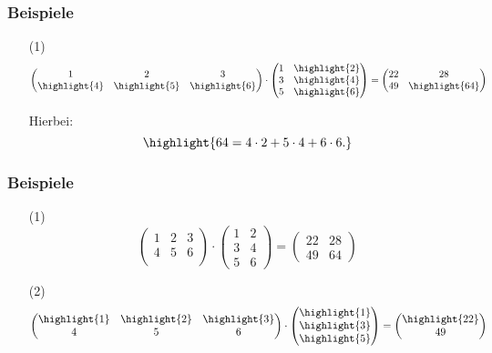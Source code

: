 %
%
\begin{frame}\frametitle{Beispiele}

	\begin{itemize}
		\item[(1)]
			$$
				\begin{pmatrix}
					1			&2			&3	\\
					\highlight{4}	&\highlight{5}	&\highlight{6}	\\		
				\end{pmatrix}
				\cdot
				\begin{pmatrix}
					1	&\highlight{2}	\\
					3	&\highlight{4}	\\
					5	&\highlight{6}	
				\end{pmatrix}
				=
				\begin{pmatrix}
					22	&28	\\
					49	&\highlight{64}
				\end{pmatrix}
			$$
	
			Hierbei:
			$$
				\highlight{64 = 4\cdot 2 + 5\cdot 4 + 6\cdot 6.}
			$$

	
	\end{itemize}
\end{frame}
%
%
\begin{frame}\frametitle{Beispiele}

	\begin{itemize}
		\item[(1)]
			$$
				\begin{pmatrix}
					1			&2			&3	\\
					{4}	&{5}	&{6}	\\		
				\end{pmatrix}
				\cdot
				\begin{pmatrix}
					1	&{2}	\\
					3	&{4}	\\
					5	&{6}	
				\end{pmatrix}
				=
				\begin{pmatrix}
					22	&28	\\
					49	&{64}
				\end{pmatrix}
			$$
	
		\item[(2)]
			$$
				\begin{pmatrix}
					\highlight{1}			&\highlight{2}			&\highlight{3}	\\
					{4}	&{5}	&{6}	\\		
				\end{pmatrix}
				\cdot
				\begin{pmatrix}
					\highlight{1}	\\
					\highlight{3}	\\
					\highlight{5}		
				\end{pmatrix}
				=
				\begin{pmatrix}
					\highlight{22}	\\
					{49}
				\end{pmatrix}
			$$
	
	\end{itemize}
\end{frame}
